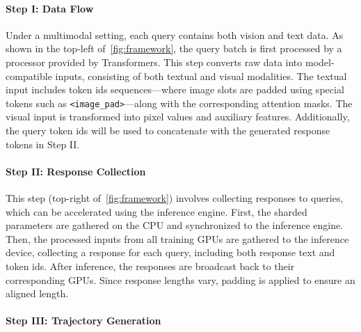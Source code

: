 \documentclass{article} %
\begin{document}
\paragraph{Step I: Data Flow}

Under a multimodal setting, each query contains both vision and text data.
%
As shown in the top-left of~\cref{fig:framework}, the query batch is first processed by a processor provided by Transformers. This step converts raw data into model-compatible inputs, consisting of both textual and visual modalities. The textual input includes token ids sequences—where image slots are padded using special tokens such as \texttt{<image\_pad>}—along with the corresponding attention masks. The visual input is transformed into pixel values and auxiliary features. Additionally, the query token ids will be used to concatenate with the generated response tokens in Step II.
%
%
%

\paragraph{Step II: Response Collection}
%
This step (top-right of~\cref{fig:framework}) involves collecting responses to queries, which can be accelerated using the inference engine.  
%
First, the sharded parameters are gathered on the CPU and synchronized to the inference engine.
%
Then, the processed inputs from all training GPUs are gathered to the inference device, collecting a response for each query, including both response text and token ids. 
%
After inference, the responses are broadcast back to their corresponding GPUs. Since response lengths vary, padding is applied to ensure an aligned length.

\paragraph{Step III: Trajectory Generation}
\end{document}
